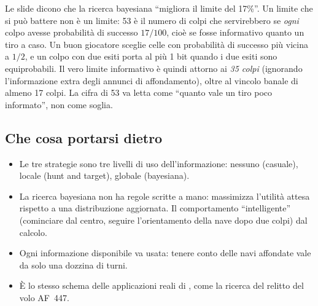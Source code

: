 \begin{attenzione}
Le slide dicono che la ricerca bayesiana ``migliora il limite del 17\%''. Un limite che si
può battere non è un limite: 53 è il numero di colpi che servirebbero se \emph{ogni}
colpo avesse probabilità di successo $17/100$, cioè se fosse informativo quanto un tiro a
caso. Un buon giocatore sceglie celle con probabilità di successo più vicina a $1/2$, e un
colpo con due esiti porta al più 1 bit quando i due esiti sono equiprobabili. Il vero
limite informativo è quindi attorno ai \emph{35 colpi} (ignorando l'informazione extra
degli annunci di affondamento), oltre al vincolo banale di almeno 17 colpi. La cifra di
53 va letta come ``quanto vale un tiro poco informato'', non come soglia.
\end{attenzione}

\subsection{Che cosa portarsi dietro}

\begin{itemize}
  \item Le tre strategie sono tre livelli di uso dell'informazione: nessuno (casuale),
        locale (hunt and target), globale (bayesiana).
  \item La ricerca bayesiana non ha regole scritte a mano: massimizza l'utilità attesa
        rispetto a una distribuzione aggiornata. Il comportamento ``intelligente''
        (cominciare dal centro, seguire l'orientamento della nave dopo due colpi)
         dal calcolo.
  \item Ogni informazione disponibile va usata: tenere conto delle navi affondate vale da
        solo una dozzina di turni.
  \item È lo stesso schema delle applicazioni reali di , come la ricerca
        del relitto del volo AF~447.
\end{itemize}

